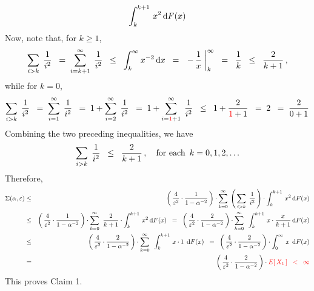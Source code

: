 \begin{enumerate}
\begin{eqnarray*}
	\int_{k}^{k+1}\, x^{2} \,\textnormal{d} F(x)
\end{eqnarray*}
Now, note that, for $k \geq 1$,
\begin{equation*}
\underset{i > k}{\sum}\;\, \dfrac{1}{i^{2}}
\;\; = \;
	\overset{\infty}{\underset{i = k+1}{\sum}}\;\, \dfrac{1}{i^{2}}
\;\; \leq \;\;
	\int_{k}^{\infty}x^{-2}\,\textnormal{d} x
\;\; = \;\;
	\left. -\,\dfrac{1}{x}\;\right\vert_{k}^{\infty}
\;\; = \;\;
	\dfrac{1}{k}
\;\; \leq \;\;
	\dfrac{2}{k+1}\,,
\end{equation*}
while for $k = 0$,
\begin{equation*}
\underset{i > k}{\sum}\;\, \dfrac{1}{i^{2}}
\;\; = \;
	\overset{\infty}{\underset{i = 1}{\sum}}\;\, \dfrac{1}{i^{2}}
\;\; = \;
	1 + \overset{\infty}{\underset{i = 2}{\sum}}\;\, \dfrac{1}{i^{2}}
\;\; = \;
	1 + \overset{\infty}{\underset{i = {\color{red}1}+1}{\sum}}\;\, \dfrac{1}{i^{2}}
\;\; \leq \;\;
	1 + \dfrac{2}{{\color{red}1}+1}
\;\; = \;
	2
\;\; = \;
	\dfrac{2}{0 + 1}
\end{equation*}
Combining the two preceding inequalities, we have
\begin{equation*}
\underset{i > k}{\sum}\;\, \dfrac{1}{i^{2}}
\;\; \leq \;\;
	\dfrac{2}{k + 1}\,,
\quad\textnormal{for each \,$k = 0, 1, 2, \ldots$}
\end{equation*}
Therefore,
\begin{eqnarray*}
\Sigma(\alpha,\varepsilon)
& \leq &
	\left(\,\dfrac{4}{\varepsilon^{2}} \cdot \dfrac{1}{1-\alpha^{-2}}\,\right) \cdot
	\overset{\infty}{\underset{k=0}{\sum}}\;
	\left(\,\underset{i > k}{\sum}\;\, \dfrac{1}{i^{2}}\,\right) \cdot
	\int_{k}^{k+1}\, x^{2} \,\textnormal{d} F(x)
\\
& \leq &
	\left(\,\dfrac{4}{\varepsilon^{2}} \cdot \dfrac{1}{1-\alpha^{-2}}\,\right) \cdot
		\overset{\infty}{\underset{k=0}{\sum}}\;\;
		\dfrac{2}{k+1} \cdot
		\int_{k}^{k+1}\, x^{2} \,\textnormal{d} F(x)
	\;\; = \;\;
		\left(\,\dfrac{4}{\varepsilon^{2}} \cdot \dfrac{2}{1-\alpha^{-2}}\,\right) \cdot
		\overset{\infty}{\underset{k=0}{\sum}}\;\;
		\int_{k}^{k+1}\, x \cdot \dfrac{x}{k+1} \,\textnormal{d} F(x)
\\
& \leq &
	\left(\,\dfrac{4}{\varepsilon^{2}} \cdot \dfrac{2}{1-\alpha^{-2}}\,\right) \cdot
	\overset{\infty}{\underset{k=0}{\sum}}\;\;
	\int_{k}^{k+1}\, x \cdot 1 \;\,\textnormal{d} F(x)
	\;\; = \;\;
	\left(\,\dfrac{4}{\varepsilon^{2}} \cdot \dfrac{2}{1-\alpha^{-2}}\,\right) \cdot
	\int_{0}^{\infty}\, x \;\,\textnormal{d} F(x)
\\
& = &
		\left(\,\dfrac{4}{\varepsilon^{2}} \cdot \dfrac{2}{1-\alpha^{-2}}\,\right) \cdot {\color{red}E\!\left[\,X_{1}\,\right]
	\;\; < \;\;
		\infty}
\end{eqnarray*}
This proves Claim 1.


\end{enumerate}

